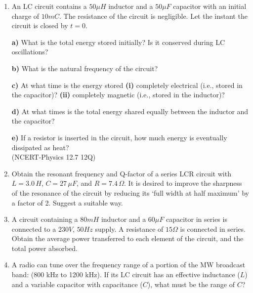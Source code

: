 \begin{enumerate}[label=\thesection.\arabic*,ref=\thesection.\theenumi]
\item An LC circuit contains a $50 \mu H$ inductor and a $50 \mu F$ capacitor with an initial charge of $10 mC$. The resistance of the circuit is negligible. Let the instant the circuit is closed by $t = 0$.

\textbf{a)} What is the total energy stored initially? Is it conserved during LC oscillations?

\textbf{b)} What is the natural frequency of the circuit?

\textbf{c)} At what time is the energy stored \textbf{(i)} completely electrical (i.e., stored in the capacitor)? \textbf{(ii)} completely magnetic (i.e., stored in the inductor)?

\textbf{d)} At what times is the total energy shared equally between the inductor and the capacitor?

\textbf{e)} If a resistor is inserted in the circuit, how much energy is eventually dissipated as heat? \\
\hfill(NCERT-Physics 12.7 12Q)\\
\solution 
\pagebreak 

\item Obtain the resonant frequency and Q-factor of a series LCR circuit with $L = 3.0\, H$, $C = 27\, \mu F$, and $R = 7.4\, \Omega$. It is desired to improve the sharpness of the resonance of the circuit by reducing its `full width at half maximum' by a factor of 2. Suggest a suitable way.\\
\solution


\pagebreak
\item A circuit containing a $80 mH$ inductor and a $60 \mu F$ capacitor in series is connected to a $230 V$, $50 Hz$ supply. A resistance of $15 \Omega $ is connected in series. Obtain the average power transferred to each element of the circuit, and the total power absorbed.\\
\solution
\pagebreak
\item A radio can tune over the frequency range of a portion of the MW broadcast band: (800 kHz to 1200 kHz). If its LC circuit has an effective inductance (\(L\)) and a variable capacitor with capacitance (\(C\)), what must be the range of \(C\)?\\
\solution
\pagebreak

\end{enumerate}
